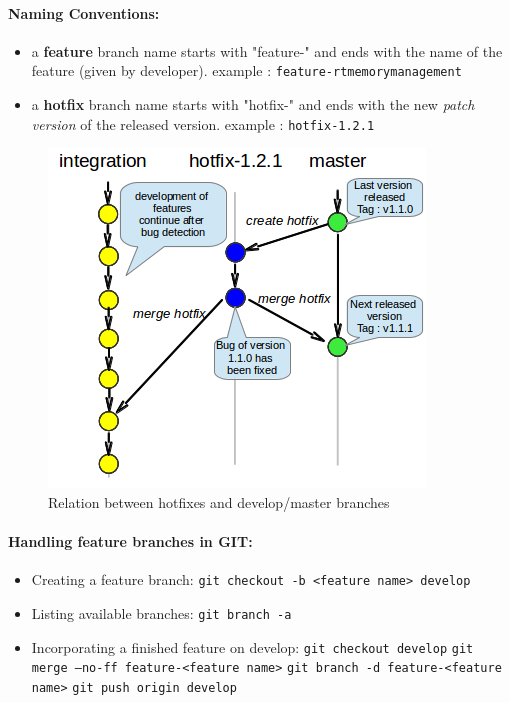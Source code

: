 \documentclass[12pt,a4paper]{article}
\begin{document}
\paragraph{Naming Conventions:}
\begin{itemize}
\item a \textbf{feature} branch name starts with "feature-" and ends with the name of the feature (given by developer).
\linebreak example : \texttt{feature-rtmemorymanagement}
\item a \textbf{hotfix} branch name starts with "hotfix-" and ends with the new \textit{patch version} of the released version.
\linebreak example : \texttt{hotfix-1.2.1}
\end{itemize}


\begin{figure}
\center
\includegraphics[scale=0.6]{images/hotfix_branching.png}
\caption{Relation between hotfixes and develop/master branches}
\end{figure}

\paragraph{Handling feature branches in GIT:}
\begin{itemize}
\item Creating a feature branch:
\linebreak \texttt{git checkout -b <feature name> develop}
\item Listing available branches:
\linebreak \texttt{git branch -a}
\item Incorporating a finished feature on develop:
\linebreak \texttt{git checkout develop}
\linebreak \texttt{git merge --no-ff feature-<feature name>}
\linebreak \texttt{git branch -d  feature-<feature name>}
\linebreak \texttt{git push origin develop}
\end{itemize}
\end{document}
